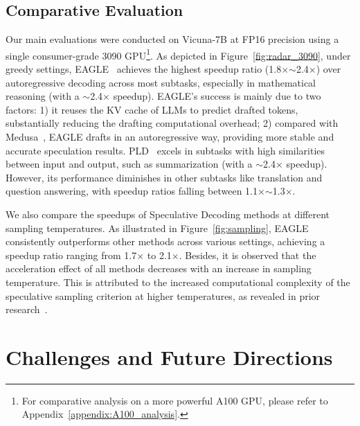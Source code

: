 \subsection{Comparative Evaluation} Our main evaluations were conducted on Vicuna-7B at FP16 precision using a single consumer-grade 3090 GPU\footnote{For comparative analysis on a more powerful A100 GPU, please refer to Appendix~\ref{appendix:A100_analysis}.}. As depicted in Figure~\ref{fig:radar_3090}, under greedy settings, EAGLE~\cite{Li:2024eagle} achieves the highest speedup ratio (1.8$\times$$\sim$2.4$\times$) over autoregressive decoding across most subtasks, especially in mathematical reasoning (with a $\sim$2.4$\times$ speedup). EAGLE's success is mainly due to two factors: 1) it reuses the KV cache of LLMs to predict drafted tokens, substantially reducing the drafting computational overhead; 2) compared with Medusa~\cite{medusa}, EAGLE drafts in an autoregressive way, providing more stable and accurate speculation results. PLD~\cite{saxena2023pld} excels in subtasks with high similarities between input and output, such as summarization (with a $\sim$2.4$\times$ speedup). However, its performance diminishes in other subtasks like translation and question answering, with speedup ratios falling between 1.1$\times$$\sim$1.3$\times$.

We also compare the speedups of Speculative Decoding methods at different sampling temperatures. As illustrated in Figure~\ref{fig:sampling}, EAGLE consistently outperforms other methods across various settings, achieving a speedup ratio ranging from 1.7$\times$ to 2.1$\times$. Besides, it is observed that the acceleration effect of all methods decreases with an increase in sampling temperature. This is attributed to the increased computational complexity of the speculative sampling criterion at higher temperatures, as revealed in prior research~\cite{gante2023assisted, Spector:2023stagedspec}.

\section{Challenges and Future Directions}
\label{sec:directions}

